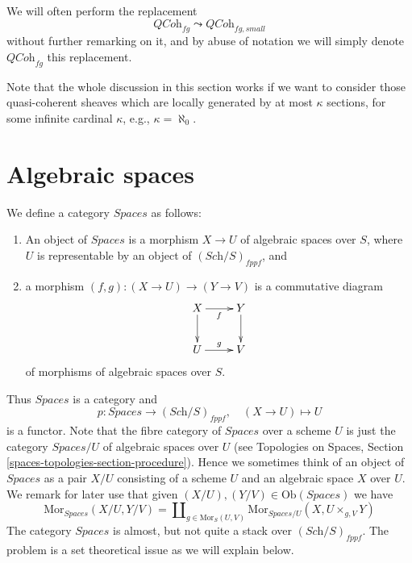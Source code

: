 \noindent
We will often perform the replacement
$$
\textit{QCoh}_{fg} \leadsto \textit{QCoh}_{fg, small}
$$
without further remarking on it, and by abuse of notation we will
simply denote $\textit{QCoh}_{fg}$ this replacement.

\begin{remark}
\label{remark-higher-rank}
Note that the whole discussion in this section works
if we want to consider those
quasi-coherent sheaves which are locally generated by at most $\kappa$
sections, for some infinite cardinal $\kappa$, e.g., $\kappa = \aleph_0$.
\end{remark}




\section{Algebraic spaces}
\label{section-stack-of-spaces}

\noindent
We define a category $\textit{Spaces}$ as follows:
\begin{enumerate}
\item An object of $\textit{Spaces}$ is a morphism $X \to U$
of algebraic spaces over $S$, where $U$ is representable by an object of
$(\textit{Sch}/S)_{fppf}$, and
\item a morphism $(f, g) : (X \to U) \to (Y \to V)$
is a commutative diagram
$$
\xymatrix{
X \ar[d] \ar[r]_f & Y \ar[d] \\
U \ar[r]^g & V
}
$$
of morphisms of algebraic spaces over $S$.
\end{enumerate}
Thus $\textit{Spaces}$ is a category and
$$
p : \textit{Spaces} \to (\textit{Sch}/S)_{fppf},
\quad
(X \to U) \mapsto U
$$
is a functor. Note that the fibre category of $\textit{Spaces}$ over
a scheme $U$ is just the category $\textit{Spaces}/U$ of
algebraic spaces over $U$ (see
Topologies on Spaces, Section \ref{spaces-topologies-section-procedure}).
Hence we sometimes think of an object of $\textit{Spaces}$ as a
pair $X/U$ consisting of a scheme $U$ and an algebraic space $X$ over $U$.
We remark for later use that given
$(X/U), (Y/V) \in \text{Ob}(\textit{Spaces})$
we have
\begin{equation}
\label{equation-morphisms-spaces}
\text{Mor}_{\textit{Spaces}}(X/U, Y/V)
=
\coprod\nolimits_{g \in \text{Mor}_S(U, V)}
\text{Mor}_{\textit{Spaces}/U}(X, U \times_{g, V} Y)
\end{equation}
The category $\textit{Spaces}$ is almost, but not quite a stack
over $(\textit{Sch}/S)_{fppf}$. The problem is a set theoretical
issue as we will explain below.

